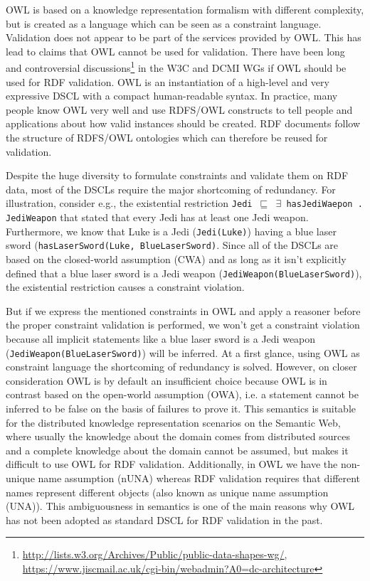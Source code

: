 \documentclass{llncs}
\newcommand{\ms}[1]{\texttt{#1}}
\begin{document}
OWL is based on a knowledge representation formalism with different complexity, but is created as a language which can be seen as a constraint language.
Validation does not appear to be part of the services provided by OWL.  
This has lead to claims that OWL cannot be used for validation. 
There have been long and controversial discussions\footnote{\url{http://lists.w3.org/Archives/Public/public-data-shapes-wg/}, \url{https://www.jiscmail.ac.uk/cgi-bin/webadmin?A0=dc-architecture}} in the W3C and DCMI WGs if OWL should be used for RDF validation.
OWL is an instantiation of a high-level and very expressive DSCL with a compact human-readable syntax.
In practice, many people know OWL very well and use RDFS/OWL constructs to tell people and applications about how valid instances should be created.
RDF documents follow the structure of RDFS/OWL ontologies which can therefore be reused for validation.

Despite the huge diversity to formulate constraints and validate them on RDF data, most of the DSCLs require the major shortcoming of redundancy. For illustration, consider e.g., the existential restriction \ms{Jedi $\sqsubseteq$ $\exists$ hasJediWaepon . JediWeapon} that stated that every Jedi has at least one Jedi weapon. Furthermore, we know that Luke is a Jedi (\ms{Jedi(Luke)}) having a blue laser sword (\ms{hasLaserSword(Luke, BlueLaserSword)}. Since all of the DSCLs are based on the closed-world assumption (CWA) and as long as it isn't explicitly defined that a blue laser sword is a Jedi weapon (\ms{JediWeapon(BlueLaserSword)}), the existential restriction causes a constraint violation.

But if we express the mentioned constraints in OWL and apply a reasoner before the proper constraint validation is performed, we won't get a constraint violation because all implicit statements like a blue laser sword is a Jedi weapon (\ms{JediWeapon(BlueLaserSword)}) will be inferred. At a first glance, using OWL as constraint language the shortcoming of redundancy is solved. However, on closer consideration OWL is by default an insufficient choice because OWL is in contrast based on the open-world assumption (OWA), i.e. a statement cannot be inferred to be false on the basis of failures to prove it. 
This semantics is suitable for the distributed knowledge representation scenarios on the Semantic Web, 
where usually the knowledge about the domain comes from distributed
sources and a complete knowledge about the domain cannot be assumed, 
but makes it difficult to use OWL for RDF validation.
Additionally, in OWL we have the non-unique name assumption (nUNA) whereas RDF validation requires that different names represent different objects (also known as unique name assumption (UNA)).
This ambiguousness in semantics is one of the main reasons why OWL has not been adopted as standard DSCL for RDF validation in the past. 
\end{document}
